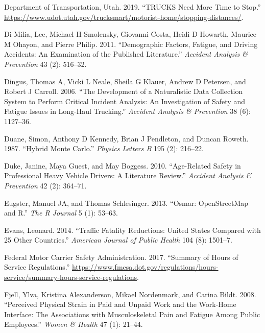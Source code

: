 \documentclass[12pt]{book}
\numberwithin{equation}{chapter}
\begin{document}
\leavevmode\hypertarget{ref-utah2019}{}%
Department of Transportation, Utah. 2019. ``TRUCKS Need More Time to Stop.'' \url{https://www.udot.utah.gov/trucksmart/motorist-home/stopping-distances/}.

\leavevmode\hypertarget{ref-di2011demographic}{}%
Di Milia, Lee, Michael H Smolensky, Giovanni Costa, Heidi D Howarth, Maurice M Ohayon, and Pierre Philip. 2011. ``Demographic Factors, Fatigue, and Driving Accidents: An Examination of the Published Literature.'' \emph{Accident Analysis \& Prevention} 43 (2): 516--32.

\leavevmode\hypertarget{ref-dingus2006development}{}%
Dingus, Thomas A, Vicki L Neale, Sheila G Klauer, Andrew D Petersen, and Robert J Carroll. 2006. ``The Development of a Naturalistic Data Collection System to Perform Critical Incident Analysis: An Investigation of Safety and Fatigue Issues in Long-Haul Trucking.'' \emph{Accident Analysis \& Prevention} 38 (6): 1127--36.

\leavevmode\hypertarget{ref-duane1987hybrid}{}%
Duane, Simon, Anthony D Kennedy, Brian J Pendleton, and Duncan Roweth. 1987. ``Hybrid Monte Carlo.'' \emph{Physics Letters B} 195 (2): 216--22.

\leavevmode\hypertarget{ref-duke2010age}{}%
Duke, Janine, Maya Guest, and May Boggess. 2010. ``Age-Related Safety in Professional Heavy Vehicle Drivers: A Literature Review.'' \emph{Accident Analysis \& Prevention} 42 (2): 364--71.

\leavevmode\hypertarget{ref-eugster2013osmar}{}%
Eugster, Manuel JA, and Thomas Schlesinger. 2013. ``Osmar: OpenStreetMap and R.'' \emph{The R Journal} 5 (1): 53--63.

\leavevmode\hypertarget{ref-evans2014traffic}{}%
Evans, Leonard. 2014. ``Traffic Fatality Reductions: United States Compared with 25 Other Countries.'' \emph{American Journal of Public Health} 104 (8): 1501--7.

\leavevmode\hypertarget{ref-hos2017}{}%
Federal Motor Carrier Safety Administration. 2017. ``Summary of Hours of Service Regulations.'' \url{https://www.fmcsa.dot.gov/regulations/hours-service/summary-hours-service-regulations}.

\leavevmode\hypertarget{ref-fjell2008perceived}{}%
Fjell, Ylva, Kristina Alexanderson, Mikael Nordenmark, and Carina Bildt. 2008. ``Perceived Physical Strain in Paid and Unpaid Work and the Work-Home Interface: The Associations with Musculoskeletal Pain and Fatigue Among Public Employees.'' \emph{Women \& Health} 47 (1): 21--44.
\end{document}
